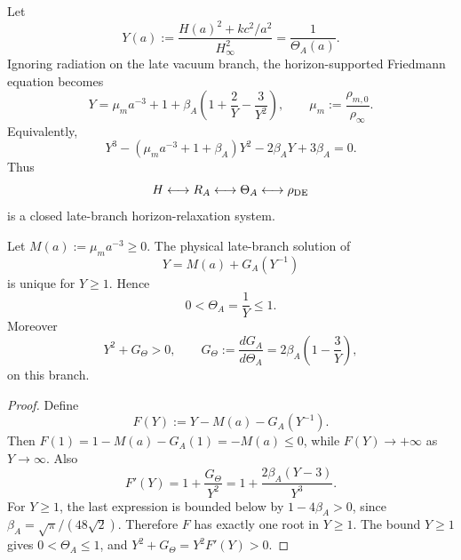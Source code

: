 \documentclass[12pt,a4paper]{article}
\begin{document}
Let
\begin{equation}
\label{p8:eq:hs-Y-def}
    Y(a):=
    \frac{H(a)^2+k c^2/a^2}{H_\infty^2}
    =
    \frac{1}{\Theta_A(a)}.
\end{equation}
Ignoring radiation on the late vacuum branch, the horizon-supported Friedmann
equation becomes
\begin{equation}
\label{p8:eq:hs-Y-implicit}
    Y
    =
    \mu_m a^{-3}
    +
    1+\beta_A\left(1+\frac2Y-\frac3{Y^2}\right),
    \qquad
    \mu_m:=\frac{\rho_{m,0}}{\rho_\infty}.
\end{equation}
Equivalently,
\begin{equation}
\label{p8:eq:hs-Y-cubic}
    Y^3
    -
    \left(\mu_m a^{-3}+1+\beta_A\right)Y^2
    -
    2\beta_A Y
    +
    3\beta_A
    =
    0.
\end{equation}
Thus
\begin{equation}
\label{p8:eq:hs-feedback-loop}
    H
    \longleftrightarrow
    R_A
    \longleftrightarrow
    \Theta_A
    \longleftrightarrow
    \rho_{\rm DE}
\end{equation}
is a closed late-branch horizon-relaxation system.

\begin{lemma}
\label{p8:lem:physical-horizon-branch}
Let \(M(a):=\mu_m a^{-3}\ge0\).  The physical late-branch solution of
\begin{equation}
\label{p8:eq:hs-physical-branch-equation}
    Y=M(a)+G_A(Y^{-1})
\end{equation}
is unique for \(Y\ge1\).  Hence
\begin{equation}
\label{p8:eq:hs-theta-bounds}
    0<\Theta_A=\frac1Y\le1.
\end{equation}
Moreover
\begin{equation}
\label{p8:eq:hs-denominator-positive}
    Y^2+G_\Theta>0,
    \qquad
    G_\Theta:=\frac{dG_A}{d\Theta_A}
    =
    2\beta_A\left(1-\frac3Y\right),
\end{equation}
on this branch.
\end{lemma}

\begin{proof}
Define
\[
    F(Y):=Y-M(a)-G_A(Y^{-1}).
\]
Then \(F(1)=1-M(a)-G_A(1)=-M(a)\le0\), while
\(F(Y)\to+\infty\) as \(Y\to\infty\).  Also
\[
    F'(Y)
    =
    1+\frac{G_\Theta}{Y^2}
    =
    1+\frac{2\beta_A(Y-3)}{Y^3}.
\]
For \(Y\ge1\), the last expression is bounded below by
\(1-4\beta_A>0\), since
\(\beta_A=\sqrt\pi/(48\sqrt2)\).  Therefore \(F\) has exactly one root in
\(Y\ge1\).  The bound \(Y\ge1\) gives \(0<\Theta_A\le1\), and
\(Y^2+G_\Theta=Y^2F'(Y)>0\).
\end{proof}
\end{document}
